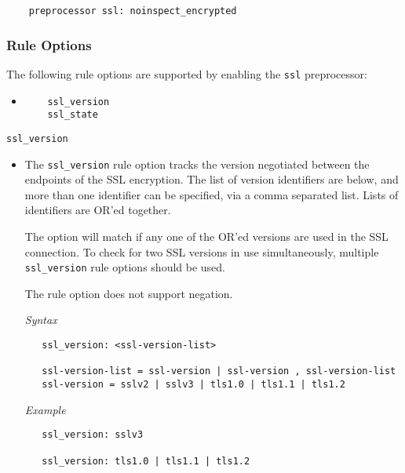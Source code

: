 \documentclass[english]{report}
\begin{document}
\begin{verbatim}
    preprocessor ssl: noinspect_encrypted
\end{verbatim}

\subsubsection{Rule Options}

The following rule options are supported by enabling the \texttt{ssl} preprocessor:

\begin{itemize}
\item[]
\begin{verbatim}
    ssl_version
    ssl_state
\end{verbatim}
\end{itemize}

\texttt{ssl\_version}
\label{ssl:ssl_version}
\begin{itemize}

\item[] The \texttt{ssl\_version} rule option tracks the version negotiated between
the endpoints of the SSL encryption.  The list of version identifiers are below, and
more than one identifier can be specified, via a comma separated list.  Lists of
identifiers are OR'ed together.

The option will match if any one of the OR'ed versions are used in the SSL
connection.  To check for two SSL versions in use simultaneously, multiple
\texttt{ssl\_version} rule options should be used.

The rule option does not support negation.

\textit{Syntax}
\footnotesize
\begin{verbatim}
   ssl_version: <ssl-version-list>

   ssl-version-list = ssl-version | ssl-version , ssl-version-list
   ssl-version = sslv2 | sslv3 | tls1.0 | tls1.1 | tls1.2
\end{verbatim}

\textit{Example}
\begin{verbatim}
   ssl_version: sslv3

   ssl_version: tls1.0 | tls1.1 | tls1.2
\end{verbatim}

\end{itemize}
\end{document}

